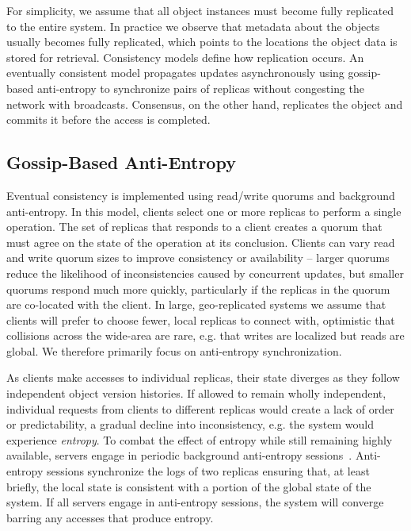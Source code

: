 For simplicity, we assume that all object instances must become fully replicated to the entire system.
In practice we observe that metadata about the objects usually becomes fully replicated, which points to the locations the object data is stored for retrieval.
Consistency models define how replication occurs.
An eventually consistent model propagates updates asynchronously using gossip-based anti-entropy to synchronize pairs of replicas without congesting the network with broadcasts.
Consensus, on the other hand, replicates the object and commits it before the access is completed.

\subsection{Gossip-Based Anti-Entropy}
\label{ch04_anti_entropy}

Eventual consistency is implemented using read/write quorums and background anti-entropy.
In this model, clients select one or more replicas to perform a single operation.
The set of replicas that responds to a client creates a quorum that must agree on the state of the operation at its conclusion.
Clients can vary read and write quorum sizes to improve consistency or availability -- larger quorums reduce the likelihood of inconsistencies caused by concurrent updates, but smaller quorums respond much more quickly, particularly if the replicas in the quorum are co-located with the client.
In large, geo-replicated systems we assume that clients will prefer to choose fewer, local replicas to connect with, optimistic that collisions across the wide-area are rare, e.g. that writes are localized but reads are global.
We therefore primarily focus on anti-entropy synchronization.

As clients make accesses to individual replicas, their state diverges as they follow independent object version histories.
If allowed to remain wholly independent, individual requests from clients to different replicas would create a lack of order or predictability, a gradual decline into inconsistency, e.g. the system would experience \emph{entropy}.
To combat the effect of entropy while still remaining highly available, servers engage in periodic background anti-entropy sessions~\cite{bayou,anti_entropy,dynamo}.
Anti-entropy sessions synchronize the logs of two replicas ensuring that, at least briefly, the local state is consistent with a portion of the global state of the system.
If all servers engage in anti-entropy sessions, the system will converge barring any accesses that produce entropy.

